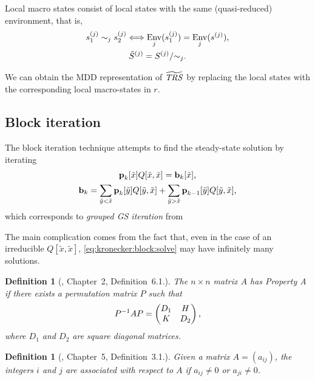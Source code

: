 \documentclass[a4paper,10pt,twoside,openright]{memoir}
\renewcommand*{\vec}[1]{\boldsymbol{\mathrm{#1}}}
\newcommand*{\TRS}{\textnormal{\emph{TRS}}}
\newcommand*{\macroS}{}\let\macroS\tilde
\newcommand*{\macroStates}{}\let\macroStates\widetilde
\newcommand*{\macroTRS}{\macroStates{\TRS}}
\DeclareMathOperator{\Env}{Env}
\newtheorem{dfn}[thm]{Definition}
\begin{document}
Local macro states consist of local states with the same
(quasi-reduced) environment, that is,
\begin{gather}
  s^{(j)}_1 \sim_j s^{(j)}_2 \Longleftrightarrow \Env_j(s^{(j)}_1) =
  \Env_j(s^{(j)}) \text, \\
  \macroS{S}^{(j)} = S^{(j)} / {\sim}_j \text.
\end{gather}

We can obtain the MDD representation of $\macroTRS$ by replacing the
local states with the corresponding local macro-states in $r$.

\subsection{Block iteration}

The block iteration technique \citep{DBLP:journals/tse/Buchholz99}
attempts to find the steady-state solution by iterating
\begin{gather}
  \vec{p}_k[\macroS{x}] Q[\macroS{x}, \macroS{x}] =
  \vec{b}_k[\macroS{x}] \text, \label{eq:kronecker:block:solve} \\
  \vec{b}_k = \sum_{\macroS{y} < \macroS{x}} \vec{p}_k[\macroS{y}]
  Q[\macroS{y}, \macroS{x}] + \sum_{\macroS{y} > \macroS{x}}
  \vec{p}_{k - 1}[\macroS{y}] Q[\macroS{y}, \macroS{x}] \text,
\end{gather}
which corresponds to \emph{grouped GS iteration} from 

The main complication comes from the fact that, even in the case of an
irreducible $Q[\macroS{x}, \macroS{x}]$,
\eqref{eq:kronecker:block:solve} may have infinitely many solutions.

\begin{dfn}[\citet{young1971iterative}, Chapter~2, Definition~6.1.]
  The $n \times n$ matrix $A$ has \emph{Property A} if there exists a
  permutation matrix $P$ such that
  \begin{align}
    P^{-1} A P = \begin{pmatrix}
      D_1 & H \\ K & D_2
    \end{pmatrix} \text,
  \end{align}
  where $D_1$ and $D_2$ are square diagonal matrices.
\end{dfn}

\begin{dfn}[\citet{young1971iterative}, Chapter~5, Definition~3.1.]
  Given a matrix $A = (a_{ij})$, the integers $i$ and $j$ are
  associated with respect to $A$ if $a_{ij} \ne 0$ or $a_{ji} \ne 0$.
\end{dfn}
\end{document}
